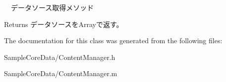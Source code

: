 　データソース取得メソッド 

\begin{DoxyReturn}{Returns}
データソースを\-Arrayで返す。 
\end{DoxyReturn}


The documentation for this class was generated from the following files\-:\begin{DoxyCompactItemize}
\item 
Sample\-Core\-Data/Content\-Manager.\-h\item 
Sample\-Core\-Data/Content\-Manager.\-m\end{DoxyCompactItemize}
